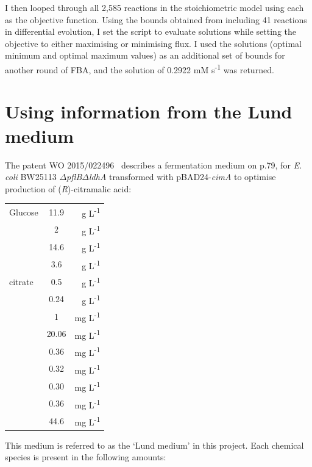 \documentclass[parskip=full, numbers=noenddot]{scrreprt}
\begin{document}
I then looped through all 2,585 reactions in the stoichiometric model using each as the objective function. Using the bounds obtained from including 41 reactions in differential evolution, I set the script to evaluate solutions while setting the objective to either maximising or minimising flux. I used the solutions (optimal minimum and optimal maximum values) as an additional set of bounds for another round of FBA, and the solution of 0.2922 mM s\textsuperscript{-1} was returned.

\section{Using information from the Lund medium}
\label{sec:lund}

The patent WO 2015/022496~\cite{eastham_process_2015} describes a fermentation medium on p.79, for \emph{E. coli} BW25113 $\Delta$\emph{pflB}$\Delta$\emph{ldhA} transformed with pBAD24-\emph{cimA} to optimise production of (\emph{R})-citramalic acid:

\begin{tabular}{lSr}
  Glucose & 11.9 & g L\textsuperscript{-1}\\
   & 2 & g L\textsuperscript{-1}\\
   & 14.6 & g L\textsuperscript{-1}\\
   & 3.6 & g L\textsuperscript{-1}\\
   citrate & 0.5 & g L\textsuperscript{-1}\\
   & 0.24 & g L\textsuperscript{-1}\\
   & 1 & mg L\textsuperscript{-1}\\
   & 20.06 & mg L\textsuperscript{-1}\\
   & 0.36 & mg L\textsuperscript{-1}\\
   & 0.32 & mg L\textsuperscript{-1}\\
   & 0.30 & mg L\textsuperscript{-1}\\
   & 0.36 & mg L\textsuperscript{-1}\\
   & 44.6 & mg L\textsuperscript{-1}
\end{tabular}

This medium is referred to as the `Lund medium' in this project. Each chemical species is present in the following amounts:
\end{document}
